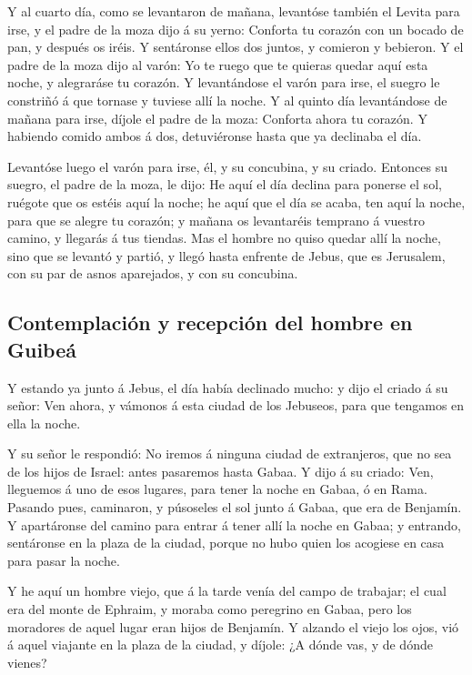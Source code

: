  Y al cuarto día, como se levantaron de mañana, levantóse
también el Levita para irse, y el padre de la moza dijo á su yerno:
Conforta tu corazón con un bocado de pan, y después os iréis.
 Y sentáronse ellos dos juntos, y comieron y bebieron. Y
el padre de la moza dijo al varón: Yo te ruego que te quieras quedar
aquí esta noche, y alegraráse tu corazón.  Y levantándose
el varón para irse, el suegro le constriñó á que tornase y tuviese allí
la noche.  Y al quinto día levantándose de mañana para
irse, díjole el padre de la moza: Conforta ahora tu corazón. Y habiendo
comido ambos á dos, detuviéronse hasta que ya declinaba el día.

 Levantóse luego el varón para irse, él, y su concubina, y
su criado. Entonces su suegro, el padre de la moza, le dijo: He aquí el
día declina para ponerse el sol, ruégote que os estéis aquí la noche; he
aquí que el día se acaba, ten aquí la noche, para que se alegre tu
corazón; y mañana os levantaréis temprano á vuestro camino, y llegarás á
tus tiendas.  Mas el hombre no quiso quedar allí la
noche, sino que se levantó y partió, y llegó hasta enfrente de Jebus,
que es Jerusalem, con su par de asnos aparejados, y con su concubina.

\hypertarget{contemplaciuxf3n-y-recepciuxf3n-del-hombre-en-guibeuxe1}{%
\subsection{Contemplación y recepción del hombre en
Guibeá}\label{contemplaciuxf3n-y-recepciuxf3n-del-hombre-en-guibeuxe1}}

 Y estando ya junto á Jebus, el día había declinado
mucho: y dijo el criado á su señor: Ven ahora, y vámonos á esta ciudad
de los Jebuseos, para que tengamos en ella la noche.

 Y su señor le respondió: No iremos á ninguna ciudad de
extranjeros, que no sea de los hijos de Israel: antes pasaremos hasta
Gabaa. Y dijo á su criado:  Ven, lleguemos á uno de esos
lugares, para tener la noche en Gabaa, ó en Rama. 
Pasando pues, caminaron, y púsoseles el sol junto á Gabaa, que era de
Benjamín.  Y apartáronse del camino para entrar á tener
allí la noche en Gabaa; y entrando, sentáronse en la plaza de la ciudad,
porque no hubo quien los acogiese en casa para pasar la noche.

 Y he aquí un hombre viejo, que á la tarde venía del
campo de trabajar; el cual era del monte de Ephraim, y moraba como
peregrino en Gabaa, pero los moradores de aquel lugar eran hijos de
Benjamín.  Y alzando el viejo los ojos, vió á aquel
viajante en la plaza de la ciudad, y díjole: ¿A dónde vas, y de dónde
vienes?

